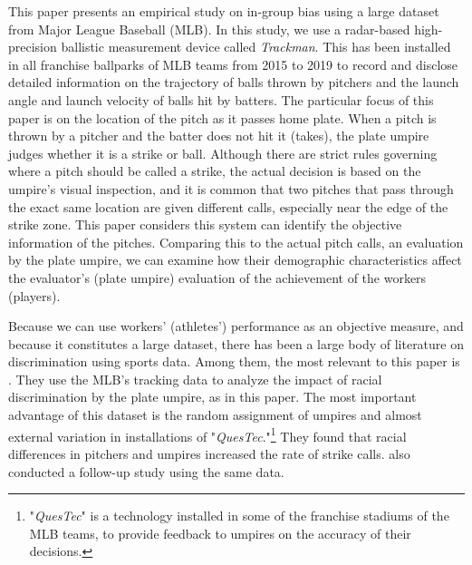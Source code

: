 \documentclass[dvipdfmx, 12pt]{jsarticle}
\begin{document}
This paper presents an empirical study on in-group bias using a large dataset from Major League Baseball (MLB). In this study, we use a radar-based high-precision ballistic measurement device called \textit{Trackman}. This has been installed in all franchise ballparks of MLB teams from 2015 to 2019 to record and disclose detailed information on the trajectory of balls thrown by pitchers and the launch angle and launch velocity of balls hit by batters. The particular focus of this paper is on the location of the pitch as it passes home plate. When a pitch is thrown by a pitcher and the batter does not hit it (takes), the plate umpire judges whether it is a strike or ball. Although there are strict rules governing where a pitch should be called a strike, the actual decision is based on the umpire's visual inspection, and it is common that two pitches that pass through the exact same location are given different calls, especially near the edge of the strike zone. This paper considers this system can identify the objective information of the pitches. Comparing this to the actual pitch calls, an evaluation by the plate umpire, we can examine how their demographic characteristics affect the evaluator's (plate umpire) evaluation of the achievement of the workers (players).

Because we can use workers' (athletes') performance as an objective measure, and because it constitutes a large dataset, there has been a large body of literature on discrimination using sports data. Among them, the most relevant to this paper is \citet{Parsons_etal_2011}. They use the MLB's tracking data to analyze the impact of racial discrimination by the plate umpire, as in this paper. The most important advantage of this dataset is the random assignment of umpires and almost external variation in installations of "\textit{QuesTec}."\footnote{"\textit{QuesTec}" is a technology installed in some of the franchise stadiums of the MLB teams, to provide feedback to umpires on the accuracy of their decisions.} They found that racial differences in pitchers and umpires increased the rate of strike calls. \citet{Tainsky_etal_2015} also conducted a follow-up study using the same data.
\end{document}
